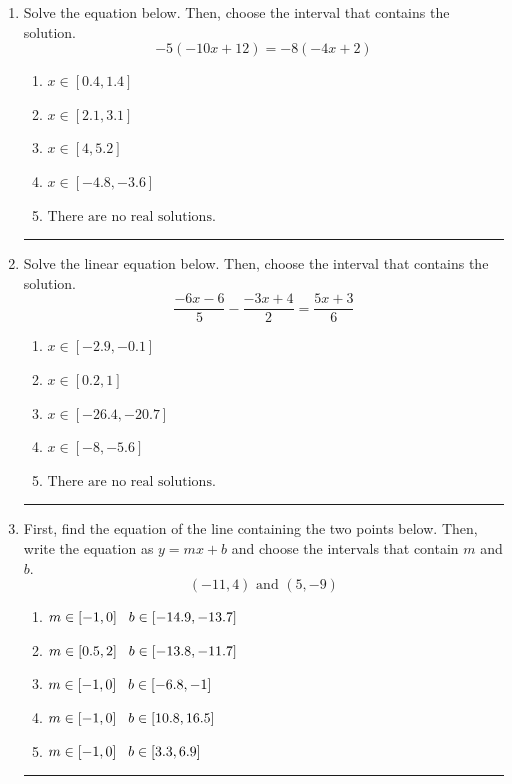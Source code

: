 \documentclass[14pt]{extbook}
\newcommand{\litem}[1]{\item#1\hspace*{-1cm}\rule{\textwidth}{0.4pt}}
\begin{document}
\begin{enumerate}
{\begin{enumerate}[label=\Alph*.]
\end{enumerate} }
\litem{
Solve the equation below. Then, choose the interval that contains the solution.\[ -5(-10x + 12) = -8(-4x + 2) \]\begin{enumerate}[label=\Alph*.]
\item \( x \in [0.4, 1.4] \)
\item \( x \in [2.1, 3.1] \)
\item \( x \in [4, 5.2] \)
\item \( x \in [-4.8, -3.6] \)
\item \( \text{There are no real solutions.} \)

\end{enumerate} }
\litem{
Solve the linear equation below. Then, choose the interval that contains the solution.\[ \frac{-6x -6}{5} - \frac{-3x + 4}{2} = \frac{5x + 3}{6} \]\begin{enumerate}[label=\Alph*.]
\item \( x \in [-2.9, -0.1] \)
\item \( x \in [0.2, 1] \)
\item \( x \in [-26.4, -20.7] \)
\item \( x \in [-8, -5.6] \)
\item \( \text{There are no real solutions.} \)

\end{enumerate} }
\litem{
First, find the equation of the line containing the two points below. Then, write the equation as $ y=mx+b $ and choose the intervals that contain $m$ and $b$.\[ (-11, 4) \text{ and } (5, -9) \]\begin{enumerate}[label=\Alph*.]
\item \( m \in [-1, 0] \hspace*{3mm} b \in [-14.9, -13.7] \)
\item \( m \in [0.5, 2] \hspace*{3mm} b \in [-13.8, -11.7] \)
\item \( m \in [-1, 0] \hspace*{3mm} b \in [-6.8, -1] \)
\item \( m \in [-1, 0] \hspace*{3mm} b \in [10.8, 16.5] \)
\item \( m \in [-1, 0] \hspace*{3mm} b \in [3.3, 6.9] \)


\end{enumerate}}
\end{enumerate}
\end{document}
